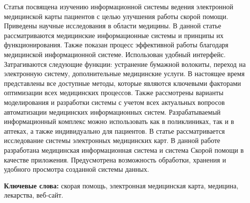 Статья посвящена изучению информационной системы
ведения электронной медицинской карты пациентов с целью улучшения работы
скорой помощи. Приведены научные исследования в области медицины. В
данной статье рассматриваются медицинские информационные системы и
принципы их функционирования. Также показан процесс эффективной работы
благодаря медицинской информационной системе. Использован удобный
интерфейс. Затрагиваются следующие функции: устранение бумажной
волокиты, переход на электронную систему, дополнительные медицинские
услуги. В настоящее время представлены все доступные методы, которые
являются ключевыми факторами оптимизации всех медицинских процессов.
Также рассмотрены варианты моделирования и разработки системы с учетом
всех актуальных вопросов автоматизации медицинских информационных
систем. Разрабатываемый информационный комплекс можно использовать как в
поликлиниках, так и в аптеках, а также индивидуально для пациентов. В
статье рассматривается исследование системы электронных медицинских
карт. В данной работе разработана медицинская информационная система и
система Скорой помощи в качестве приложения. Предусмотрена возможность
обработки, хранения и удобного просмотра созданной системы данных.

{\bfseries Ключевые слова:} скорая помощь, электронная медицинская карта,
медицина, лекарства, веб-сайт.

\vspace{0.5em}

